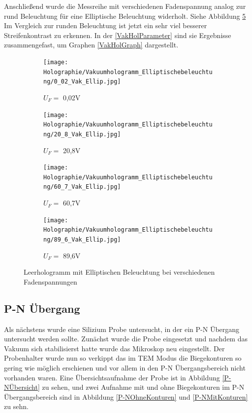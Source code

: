 Anschließend wurde die Messreihe mit verschiedenen Fadenspannung analog zur rund Beleuchtung für eine Elliptische Beleuchtung widerholt. Siehe Abbildung \cref{VakHolEllip} Im Vergleich zur runden Beleuchtung ist jetzt ein sehr viel besserer Streifenkontrast zu erkennen. 
In der \cref{VakHolParameter} sind sie Ergebnisse zusammengefast, um Graphen \cref{VakHolGraph} dargestellt.

\begin{figure}[H]
     \centering
     \begin{subfigure}[b]{0.49\textwidth}
         \centering
         \texttt{[image: Holographie/Vakuumhologramm\_Elliptischebeleuchtung/0\_02\_Vak\_Ellip.jpg]}
         \caption{\(U_F =\) 0,02V}
         \label{002VakEllip}
     \end{subfigure}
     \hfill
     \begin{subfigure}[b]{0.49\textwidth}
         \centering
         \texttt{[image: Holographie/Vakuumhologramm\_Elliptischebeleuchtung/20\_8\_Vak\_Ellip.jpg]}
         \caption{\(U_F =\) 20,8V}
         \label{208VakEllip}
     \end{subfigure}
      

 \centering
     \begin{subfigure}[b]{0.49\textwidth}
         \centering
         \texttt{[image: Holographie/Vakuumhologramm\_Elliptischebeleuchtung/60\_7\_Vak\_Ellip.jpg]}
         \caption{\(U_F =\) 60,7V}
         \label{604VakEllip}
     \end{subfigure}
     \hfill
     \begin{subfigure}[b]{0.49\textwidth}
         \centering
         \texttt{[image: Holographie/Vakuumhologramm\_Elliptischebeleuchtung/89\_6\_Vak\_Ellip.jpg]}
         \caption{\(U_F =\) 89,6V}
         \label{896VakEllip}
     \end{subfigure}
     \caption{Leerhologramm mit Elliptischen Beleuchtung bei verschiedenen Fadenspannungen}
        \label{VakHolEllip}
 
\end{figure}

\subsection{P-N Übergang}

Als nächstens wurde eine Silizium Probe untersucht, in der ein P-N Übergang untersucht werden sollte. Zunächst wurde die Probe eingesetzt und nachdem das Vakuum sich stabilisierst hatte wurde das Mikroskop neu eingestellt. Der Probenhalter wurde nun so verkippt das im TEM Modus die Biegekonturen so gering wie möglich erschienen und vor allem in den P-N Übergangsbereich nicht vorhanden waren. Eine Übersichtsaufnahme der Probe ist in Abbildung \cref{P-NÜbersicht} zu sehen, und zwei Aufnahme mit und ohne Biegekonturen im P-N Übergangsbereich sind in Abbildung \cref{P-NOhneKonturen} und \cref{P-NMitKonturen} zu sehn.

